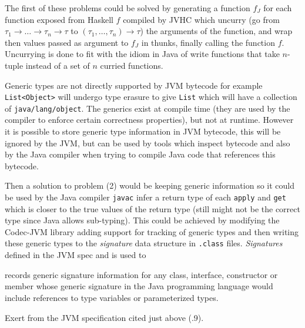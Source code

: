 \documentclass[float=false, crop=false]{standalone}
\begin{document}
The first of these problems could be solved by generating a function $f_J$ for each 
function exposed from Haskell $f$ compiled by JVHC which uncurry 
(go from \mbox{$\tau_1 \rightarrow \dotsc \rightarrow \tau_n \rightarrow \tau$} to
\mbox{$(\tau_1,\dotsc,\tau_n) \rightarrow \tau$}) the arguments of the function, and 
wrap then values passed as argument to $f_J$ in thunks, finally calling the function $f$. 
Uncurrying is done to fit with the idiom in Java of write functions that take 
$n$-tuple instead of a set of $n$ curried functions. 


Generic types are not directly supported by JVM bytecode for example
\verb|List<Object>| will undergo type erasure to give \verb|List| which
will have a collection of \verb|java/lang/object|. 
The generics exist at compile time (they are used by the compiler to enforce 
certain correctness properties), but not at runtime.
However it is possible to store generic type information
in JVM bytecode, this will be ignored by the JVM, but can be used by tools
which inspect bytecode and also by the Java compiler when trying to compile
Java code that references this bytecode.

Then a solution to problem (2) would be keeping generic information so it 
could be used by the Java compiler \texttt{javac} infer a return type of 
each \texttt{apply} and \texttt{get} which is closer to the true 
values of the return type (still might not be the correct type 
since Java allows sub-typing). 
This could be achieved by modifying the Codec-JVM library 
\cite{codec-jvm-link} adding support for tracking of generic types and then 
writing these generic types to the \textit{signature} data structure in 
\verb|.class| files. \textit{Signatures} defined in the JVM spec
\cite[.9]{jvm-spec8} and is used to 
\begin{displayquote}
  records generic signature information for any class, interface, 
  constructor or member whose generic signature in the Java 
  programming language would include references to type variables 
  or parameterized types.
\end{displayquote}
\begin{flushright}
Exert from the JVM specification cited just above (.9).
\end{flushright}
\end{document}
